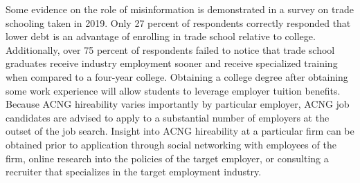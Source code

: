 \documentclass[review]{elsarticle}
\begin{document}
Some evidence on the role of misinformation is demonstrated in a survey on trade schooling taken in 2019\cite{arabia_2019}.
Only 27 percent of respondents correctly responded that lower debt is an advantage of enrolling in trade school relative to college.
Additionally, over 75 percent of respondents failed to notice that trade school graduates receive industry employment sooner
and receive specialized training when compared to a four-year college.
Obtaining a college degree after obtaining some work experience will allow students to leverage employer tuition benefits.
Because ACNG hireability varies importantly by particular employer, ACNG job candidates are advised to apply to a substantial number of employers at the outset of the job search.
Insight into ACNG hireability at a particular firm can be obtained prior to application through social networking with employees of the firm,
online research into the policies of the target employer,
or consulting a recruiter that specializes in the target employment industry.

\end{document}
